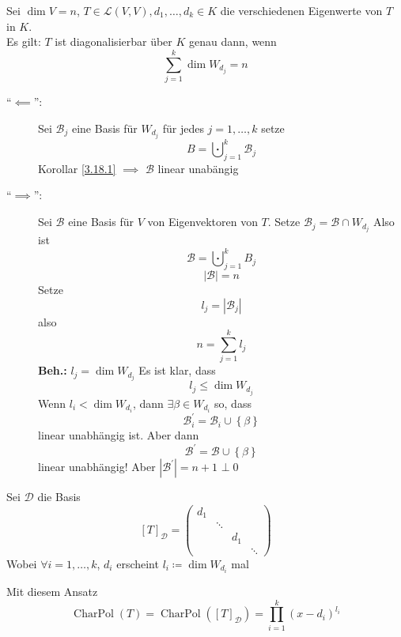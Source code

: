 \begin{subtheorem}
	Sei $ \dim V = n $, $ T \in \mathcal{L} \left( V, V \right) , d_1, \dotsc, d_k \in K $ die verschiedenen Eigenwerte von $ T $ in $ K $.\\
	Es gilt:
	$ T $ ist diagonalisierbar über $ K $ genau dann, wenn
	\[
		\sum_{j=1}^{k} \dim W_{d_j}  = n
	\]
\end{subtheorem}
\begin{subproof*}
	\begin{description}
		\item[``$ \impliedby  $'':] Sei $ \mathcal{B} _j $ eine Basis für $ W_{d_j}  $ für jedes $ j = 1, \dotsc, k $ setze 
			\[
				B = \bigcupdot_{j = 1} ^{k} \mathcal{B} _j
			\]
			Korollar \ref{3.18.1} $ \implies  $ $ \mathcal{B}  $ linear unabängig
		\item[``$ \implies  $'':]
			Sei $ \mathcal{B}  $ eine Basis für $ V $ von Eigenvektoren von $ T $.
			Setze $ \mathcal{B} _j = \mathcal{B} \cap W_{d_j}  $ Also ist
			\[
				\mathcal{B} = \bigcupdot_{j = 1} ^{k} B_j
			\]
			\[
				\left| \mathcal{B}  \right| = n
			\]
			Setze 
			\[
				l_j = \left| \mathcal{B} _j \right| 
			\]
			also 
			\[
				n = \sum_{j=1}^{k} l_j
			\]
			\textbf{Beh.:}
			$ l_j = \dim W_{d_j}  $ 
			Es ist klar, dass
			\[
				l_j \leq \dim W_{d_j} 
			\]
			Wenn $ l_i < \dim W_{d_i}  $, dann $ \exists \beta \in W_{d_i}  $ so, dass
			\[
				\mathcal{B} _i^\prime = \mathcal{B} _i \cup \left\{ \beta \right\} 
			\]
			linear unabhängig ist.
			Aber dann
			\[
				\mathcal{B} ^\prime = \mathcal{B} \cup \left\{ \beta \right\} 
			\]
			linear unabhängig!
			Aber $ \left| \mathcal{B}^\prime \right| = n + 1 $ $ \bot $\qed
	\end{description}
\end{subproof*}

Sei $ \mathcal{D}  $ die Basis
\[
	[T]_{\mathcal{D} } = \begin{pmatrix} d_1 \\ & \ddots \\ & & d_1 \\ &&& \ddots \end{pmatrix} 
\]
Wobei $ \forall i = 1, \dotsc, k $, $ d_i $ erscheint $ l_i \coloneqq \dim W_{d_i} $ mal

Mit diesem Ansatz
\begin{equation}
	\label{eq:3.18.1}
	\tag{$ \dag $}
	\operatorname{Char Pol}(T) = \operatorname{Char Pol}\left( [T]_{\mathcal{D} }  \right) = \prod_{i = 1}^{k} \left( x - d_i \right) ^{l_i}  
\end{equation}

